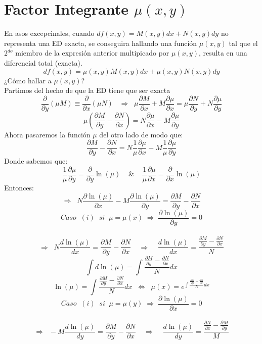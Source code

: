 \documentclass[10pt]{article}
\begin{document}
\section{Factor Integrante $\mu(x,y)$}
En asos excepcinales, cuando $df(x,y)=M(x,y)dx+N(x,y)dy$ no representa una ED exacta, se conseguira hallando una función $\mu(x,y)$ tal que el $2^{do}$ miembro de la expresión anterior multipicado por $\mu(x,y)$, resulta en una diferencial total (exacta).
\[df(x,y)=\mu(x,y)M(x,y)dx+\mu(x,y)N(x,y)dy\]
¿Cómo hallar a $\mu(x,y)$?\\
Partimos del hecho de que la ED tiene que ser exacta
\[\frac{\partial}{\partial{y}}(\mu M)\equiv \frac{\partial}{\partial{x}}(\mu N)\;\;\;\Rightarrow\;\;\mu\frac{\partial{M}}{\partial{x}}+M\frac{\partial{\mu}}{\partial{x}}=\mu\frac{\partial{N}}{\partial{y}}+N\frac{\partial{\mu}}{\partial{y}}\]
\[\mu\left(\frac{\partial{M}}{\partial{y}}-\frac{\partial{N}}{\partial{x}}\right)=N\frac{\partial{\mu}}{\partial{x}}-M\frac{\partial{\mu}}{\partial{y}}\]
Ahora pasaremos la función $\mu$ del otro lado de modo que:
\[\frac{\partial{M}}{\partial{y}}-\frac{\partial{N}}{\partial{x}}=N\frac{1}{\mu}\frac{\partial{\mu}}{\partial{x}}-M\frac{1}{\mu}\frac{\partial{\mu}}{\partial{y}}\]
Donde sabemos que:
\[\frac{1}{\mu}\frac{\partial{\mu}}{\partial{y}}=\frac{\partial}{\partial{y}}\ln(\mu)\;\;\;\;\&\;\;\;\;\frac{1}{\mu}\frac{\partial{\mu}}{\partial{x}}=\frac{\partial}{\partial{x}}\ln(\mu)\]
Entonces:
\[\Rightarrow\;\;N\frac{\partial{\ln(\mu)}}{\partial{x}}-M\frac{\partial{\ln(\mu)}}{\partial{y}}=\frac{\partial{M}}{\partial{y}}-\frac{\partial{N}}{\partial{x}}\]
\vspace{0.5cm}
\[Caso\;\;(i)\;\;si\;\;\mu=\mu(x)\;\Rightarrow\;\frac{\partial{\ln(\mu)}}{\partial{y}}=0\]\\
\[\Rightarrow\;\;N\frac{d\ln(\mu)}{dx}=\frac{\partial{M}}{\partial{y}}-\frac{\partial{N}}{\partial{x}}\;\;\;\;\Rightarrow\;\;\;\;\frac{d\ln(\mu)}{dx}=\frac{\frac{\partial{M}}{\partial{y}}-\frac{\partial{N}}{\partial{x}}}{N}\]
\[\int d\ln(\mu)=\int\frac{\frac{\partial{M}}{\partial{y}}-\frac{\partial{N}}{\partial{x}}}{N}dx\]
\[\ln(\mu)=\int\frac{\frac{\partial{M}}{\partial{y}}-\frac{\partial{N}}{\partial{x}}}{N}dx\;\;\Leftrightarrow\;\;\mu(x)=e^{\int{\frac{\frac{\partial{M}}{\partial{y}}-\frac{\partial{N}}{\partial{x}}}{N}dx}}\]
\vspace{1cm}
\[Caso\;\;(i)\;\;si\;\;\mu=\mu(y)\;\Rightarrow\;\frac{\partial{\ln(\mu)}}{\partial{x}}=0\]\\
\[\Rightarrow\;\;-M\frac{d\ln(\mu)}{dy}=\frac{\partial{M}}{\partial{y}}-\frac{\partial{N}}{\partial{x}}\;\;\;\;\Rightarrow\;\;\;\;\frac{d\ln(\mu)}{dy}=\frac{\frac{\partial{N}}{\partial{x}}-\frac{\partial{M}}{\partial{y}}}{M}\]
\end{document}
